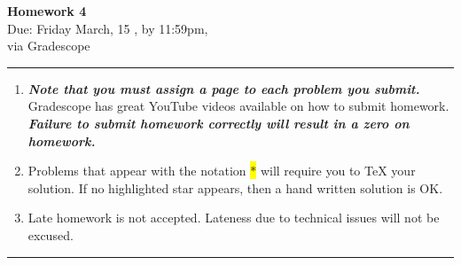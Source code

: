 \documentclass[12pt]{article}
\newif\ifshow
\begin{document}
\begin{center}
\ifshow
  \textbf{\Large Homework 4 Solution}\\
\else
  \textbf{\Large Homework 4}\\
\fi
Due: Friday March, 15 , by 11:59pm,\\via Gradescope\\
\end{center}

\hrule

\vspace{0.2cm}

\begin{enumerate}[$\bullet$]
\item  {\textbf{\textit{Note that you must assign a page to each problem you submit.}}}   Gradescope has great YouTube videos available on how to submit homework.  \textit{\textbf{Failure to submit homework correctly will result in a zero on homework.}}
\item Problems that appear with the notation \colorbox{yellow}{$\ast$} will require you to TeX your solution.  If no highlighted star appears, then a hand written solution is OK.  
\item Late homework is not accepted.  Lateness due to technical issues will not be excused.  
\end{enumerate}

\hrule

\vspace{0.5cm}
\end{document}
